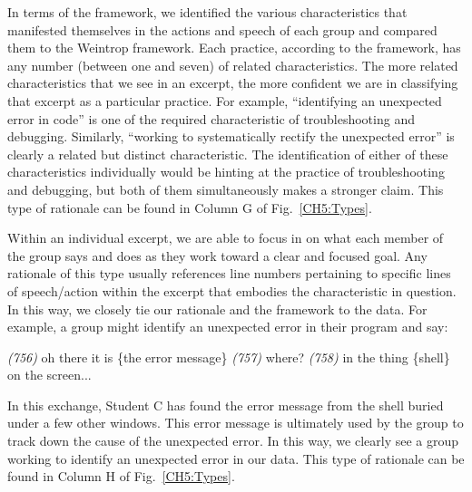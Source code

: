 \documentclass{msuphddissertation}
\begin{document}
\begin{doublespace}
In terms of the framework, we identified the various characteristics that manifested themselves in the actions and speech of each group and compared them to the Weintrop framework.  Each practice, according to the framework, has any number (between one and seven) of related characteristics.  The more related characteristics that we see in an excerpt, the more confident we are in classifying that excerpt as a particular practice.  For example, ``identifying an unexpected error in code'' is one of the required characteristic of troubleshooting and debugging.  Similarly, ``working to systematically rectify the unexpected error'' is clearly a related but distinct characteristic.  The identification of either of these characteristics individually would be hinting at the practice of troubleshooting and debugging, but both of them simultaneously makes a stronger claim.  This type of rationale can be found in Column G of Fig.~\ref{CH5:Types}.

Within an individual excerpt, we are able to focus in on what each member of the group says and does as they work toward a clear and focused goal.  Any rationale of this type usually references line numbers pertaining to specific lines of speech/action within the excerpt that embodies the characteristic in question.  In this way, we closely tie our rationale and the framework to the data.  For example, a group might identify an unexpected error in their program and say: \begin{description}
\SC \textit{(756)} oh there it is \{the error message\}
\SB \textit{(757)} where?
\SC \textit{(758)} in the thing \{shell\} on the screen...
\end{description}  In this exchange, Student C has found the error message from the shell buried under a few other windows.  This error message is ultimately used by the group to track down the cause of the unexpected error.  In this way, we clearly see a group working to identify an unexpected error in our data.  This type of rationale can be found in Column H of Fig.~\ref{CH5:Types}.


\end{doublespace}
\end{document}
